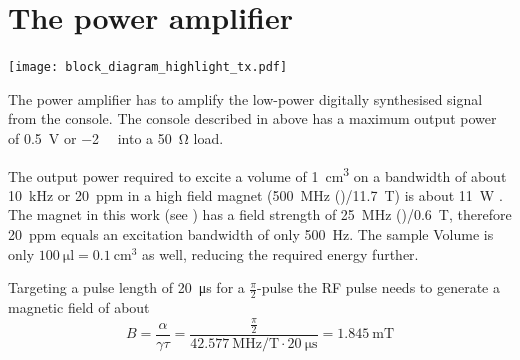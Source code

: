 
\section{The power amplifier}
\begin{marginfigure}[-4.5\baselineskip]
    \texttt{[image: block\_diagram\_highlight\_tx.pdf]}
\end{marginfigure}

The power amplifier has to amplify the low-power digitally synthesised signal from the console. The console described in  above has a maximum output power of \qty{0.5}{\volt} or \qty{-2}{\deci\belm} into a \qty{50}{\ohm} load.

The output power required to excite a volume of \qty{1}{\centi\meter\cubed} on a bandwidth of about \qty{10}{\kilo\hertz} or \qty{20}{ppm} in a high field magnet (\qty{500}{\mega\hertz} ()/\qty{11.7}{\tesla}) is about \qty{11}{\watt} . The magnet in this work (see ) has a field strength of \qty{25}{\mega\hertz} ()/\qty{0.6}{\tesla}, therefore \qty{20}{ppm} equals an excitation bandwidth of only \qty{500}{\hertz}. The sample Volume is only \(\qty{100}{\micro\litre} = \qty{0.1}{\centi\meter\cubed}\) as well, reducing the required energy further.

Targeting a pulse length of \qty{20}{\micro\second} for a  \(\frac{\pi}{2}\)-pulse the RF pulse needs to generate a magnetic field of about
\[
    B = \frac{\alpha}{\gamma\tau} = \frac{\frac{\pi}{2}}{\qty{42.577}{\mega\hertz\per\tesla}\cdot{}\qty{20}{\micro\second}} = \qty{1.845}{\milli\tesla}
\]

